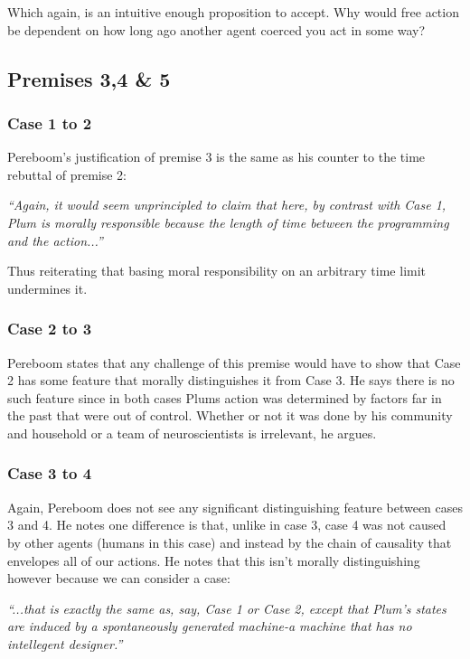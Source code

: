 \documentclass{article}
\begin{document}
Which again, is an intuitive enough proposition to accept. Why would free action be dependent on how long ago another agent coerced you act in some way?

\subsection{Premises 3,4 \& 5}
\subsubsection{Case 1 to 2}
Pereboom's justification of premise 3 is the same as his counter to the time rebuttal of premise 2:
\begin{displayquote}
  \textit{``Again, it would seem unprincipled to claim that here, by contrast with Case 1, Plum is morally responsible because the length of time between the programming and the action...''}
\end{displayquote}

Thus reiterating that basing moral responsibility on an arbitrary time limit undermines it.

\subsubsection{Case 2 to 3}
Pereboom states that any challenge of this premise would have to show that Case 2 has some feature that morally distinguishes it from Case 3. He says there is no such feature since in both cases Plums action was determined by factors far in the past that were out of control. Whether or not it was done by his community and household or a team of neuroscientists is irrelevant, he argues.

\subsubsection{Case 3 to 4}
Again, Pereboom does not see any significant distinguishing feature between cases 3 and 4. He notes one difference is that, unlike in case 3, case 4 was not caused by other agents (humans in this case) and instead by the chain of causality that envelopes all of our actions. He notes that this isn't morally distinguishing however because we can consider a case:
\begin{displayquote}
  \textit{``...that is exactly the same as, say, Case 1 or Case 2, except that Plum's states are induced by a spontaneously generated machine-a machine that has no intellegent designer.''}
\end{displayquote}
\end{document}
